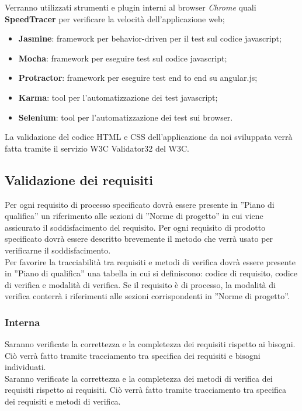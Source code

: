 {	
	Verranno utilizzati strumenti e plugin interni al browser \emph{Chrome} quali \textbf{SpeedTracer} per verificare la velocità dell'applicazione web;
	
	\begin{itemize}
	
    \item \textbf{Jasmine}: framework per behavior-driven per il test sul codice javascript;
	\item \textbf{Mocha}: framework per eseguire test sul codice javascript;
	\item \textbf{Protractor}: framework per eseguire test end to end su angular.js;
	\item \textbf{Karma}: tool per l'automatizzazione dei test javascript;
	\item \textbf{Selenium}: tool per l'automatizzazione dei test sui browser.
   \end{itemize}
	
	
	La validazione del codice HTML e CSS dell’applicazione da noi sviluppata verrà
	fatta tramite il servizio W3C Validator32 del W3C.
		\subsection{Validazione dei requisiti}{
		 				Per ogni requisito\ped{g} di processo specificato dovrà essere presente in ”Piano di qualifica” un riferimento alle sezioni di ”Norme di progetto” in cui viene assicurato il soddisfacimento del requisito\ped{g}. Per ogni requisito di prodotto specificato dovrà essere descritto brevemente il metodo che verrà usato per verificarne il soddisfacimento.\\Per favorire la tracciabilità tra requisiti e metodi di verifica dovrà essere presente in ”Piano di qualifica” una tabella in cui si definiscono: codice\ped{g} di requisito, codice di verifica e modalità di verifica. Se il requisito\ped{g} è di processo, la modalità di verifica conterrà i riferimenti alle sezioni corrispondenti in ”Norme di progetto”.
			\subsubsection{Interna}{
				Saranno verificate la correttezza e la completezza dei requisiti rispetto ai bisogni. Ciò verrà fatto tramite tracciamento tra specifica dei requisiti e bisogni individuati.\\Saranno verificate la correttezza e la completezza dei metodi di verifica dei requisiti
				rispetto ai requisiti. Ciò verrà fatto tramite tracciamento tra specifica dei requisiti e metodi di verifica.
			}
}}
